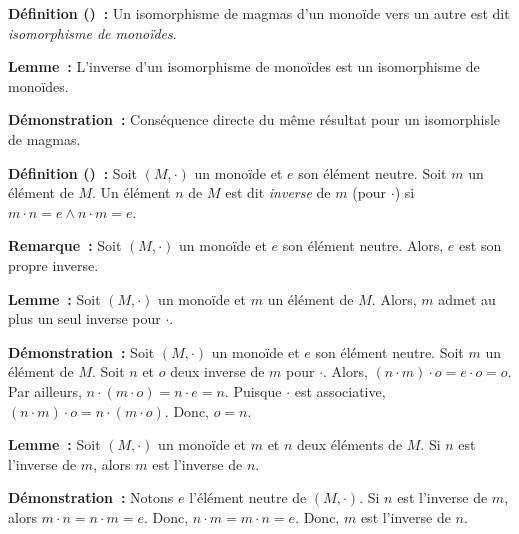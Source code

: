 \medskip

\noindent\textbf{Définition () :} Un isomorphisme de magmas d'un monoïde vers un autre est dit \textit{isomorphisme de monoïdes}.

\medskip

\noindent\textbf{Lemme :} L'inverse d'un isomorphisme de monoïdes est un isomorphisme de monoïdes.

\medskip

\noindent\textbf{Démonstration :} Conséquence directe du même résultat pour un isomorphisle de magmas.

\medskip

\noindent\textbf{Définition () :} Soit $(M,\cdot)$ un monoïde et $e$ son élément neutre. 
    Soit $m$ un élément de $M$. 
    Un élément $n$ de $M$ est dit \textit{inverse} de $m$ (pour $\cdot$) si $m \cdot n = e \wedge  n \cdot m = e$.

\medskip

\noindent\textbf{Remarque :} Soit $(M,\cdot)$ un monoïde et $e$ son élément neutre.
    Alors, $e$ est son propre inverse.
    
\medskip

\noindent\textbf{Lemme :} Soit $(M,\cdot)$ un monoïde et $m$ un élément de $M$.
    Alors, $m$ admet au plus un seul inverse pour $\cdot$.

\medskip

\noindent\textbf{Démonstration :} Soit $(M,\cdot)$ un monoïde et $e$ son élément neutre. 
    Soit $m$ un élément de $M$. 
    Soit $n$ et $o$ deux inverse de $m$ pour $\cdot$. 
    Alors, $(n \cdot m) \cdot o = e \cdot o = o$.
    Par ailleurs, $n \cdot (m \cdot o) = n \cdot e = n$.
    Puisque $\cdot$ est associative, $(n \cdot m) \cdot o = n \cdot (m \cdot o)$. 
    Donc, $o = n$.

    \hfill \square

\medskip

\noindent\textbf{Lemme :} Soit $(M,\cdot)$ un monoïde et $m$ et $n$ deux éléments de $M$.
    Si $n$ est l'inverse de $m$, alors $m$ est l'inverse de $n$.

\medskip

\noindent\textbf{Démonstration :} 
    Notons $e$ l'élément neutre de $(M, \cdot)$.
    Si $n$ est l'inverse de $m$, alors $m \cdot n = n \cdot m = e$.
    Donc, $n \cdot m = m \cdot n = e$.
    Donc, $m$ est l'inverse de $n$.

    \done

\medskip

